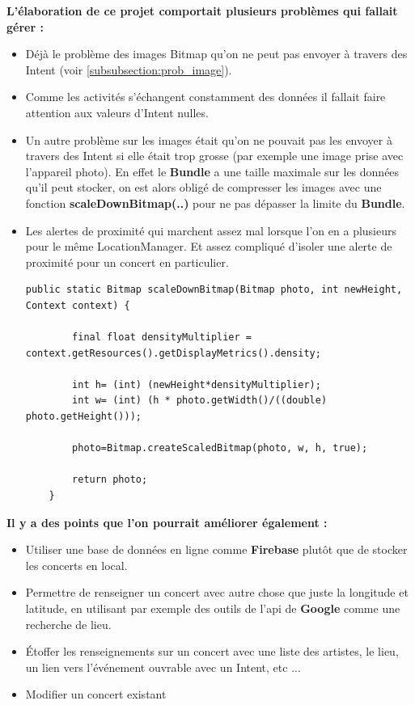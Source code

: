 \documentclass{article}
\begin{document}
\textbf{L'élaboration de ce projet comportait plusieurs problèmes qui fallait gérer :}
\begin{itemize}
\item Déjà le problème des images Bitmap qu'on ne peut pas envoyer à travers des Intent (voir \ref{subsubsection:prob_image}).
\item Comme les activités s'échangent constamment des données il fallait faire attention aux valeurs d'Intent nulles.
\item Un autre problème sur les images était qu'on ne pouvait pas les envoyer à travers des Intent si elle était trop grosse (par exemple une image prise avec l'appareil photo). En effet le \textbf{Bundle} a une taille maximale sur les données qu'il peut stocker, on est alors obligé de compresser les images avec une fonction \textbf{scaleDownBitmap(..)} pour ne pas dépasser la limite du \textbf{Bundle}.
\item Les alertes de proximité qui marchent assez mal lorsque l'on en a plusieurs pour le même LocationManager. Et assez compliqué d'isoler une alerte de proximité pour un concert en particulier.
\begin{verbatim}
public static Bitmap scaleDownBitmap(Bitmap photo, int newHeight, Context context) {

        final float densityMultiplier = context.getResources().getDisplayMetrics().density;

        int h= (int) (newHeight*densityMultiplier);
        int w= (int) (h * photo.getWidth()/((double) photo.getHeight()));

        photo=Bitmap.createScaledBitmap(photo, w, h, true);

        return photo;
    }
\end{verbatim}  
\end{itemize}
\vspace{1\baselineskip}
\textbf{Il y a des points que l'on pourrait améliorer également :} 
\begin{itemize}
\item Utiliser une base de données en ligne comme \textbf{Firebase} plutôt que de stocker les concerts en local.
\item Permettre de renseigner un concert avec autre chose que juste la longitude et latitude, en utilisant par exemple des outils de l'api de \textbf{Google} comme une recherche de lieu.
\item Étoffer les renseignements sur un concert avec une liste des artistes, le lieu, un lien vers l'événement ouvrable avec un Intent, etc ...
\item Modifier un concert existant
\end{itemize}



\nocite{*}
\end{document}
